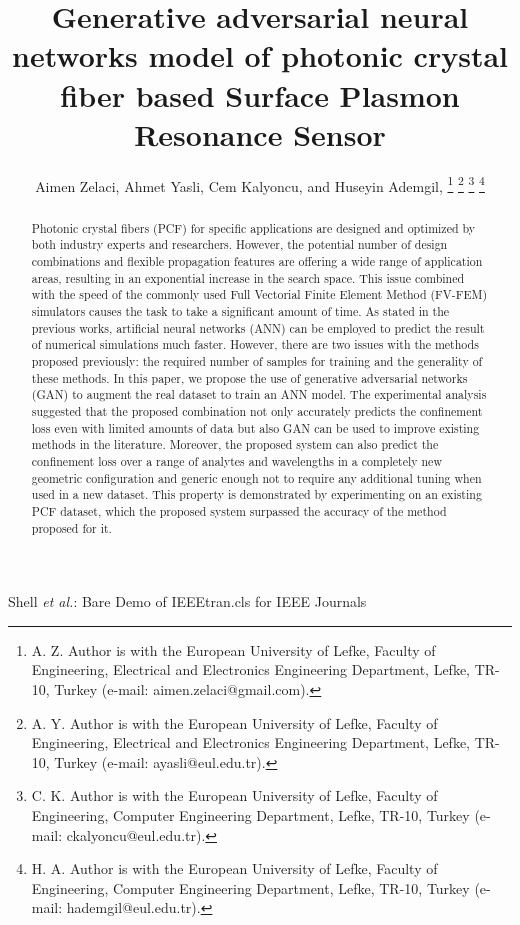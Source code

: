 \documentclass[journal]{IEEEtran}
\begin{document}
\title{Generative adversarial neural networks model of photonic crystal fiber based Surface Plasmon Resonance Sensor}
\author{
	Aimen Zelaci, Ahmet Yasli, Cem Kalyoncu, and Huseyin Ademgil, 
	\thanks{A. Z. Author is with 
		the European University of Lefke, Faculty of Engineering, Electrical and Electronics Engineering Department, Lefke, TR-10, Turkey (e-mail: aimen.zelaci@gmail.com).
	}
	\thanks{A. Y. Author is with 
		the European University of Lefke, Faculty of Engineering, Electrical and Electronics Engineering Department, Lefke, TR-10, Turkey (e-mail: ayasli@eul.edu.tr).
	}
	\thanks{C. K. Author is with 
		the European University of Lefke, Faculty of Engineering, Computer Engineering Department, Lefke, TR-10, Turkey (e-mail: ckalyoncu@eul.edu.tr).
	}
	\thanks{H. A. Author is with 
		the European University of Lefke, Faculty of Engineering, Computer Engineering Department, Lefke, TR-10, Turkey (e-mail: hademgil@eul.edu.tr).
	}
}



%
{Shell \MakeLowercase{\textit{et al.}}: Bare Demo of IEEEtran.cls for IEEE Journals}




\maketitle

\begin{abstract}
	Photonic crystal fibers (PCF) for specific applications are designed and optimized by both industry experts and researchers. However, the potential number of design combinations and flexible propagation features are offering a wide range of application areas, resulting in an exponential increase in the search space. This issue combined with the speed of the commonly used Full Vectorial Finite Element Method (FV-FEM) simulators causes the task to take a significant amount of time. As stated in the previous works, artificial neural networks (ANN) can be employed to predict the result of numerical simulations much faster. However, there are two issues with the methods proposed previously: the required number of samples for training and the generality of these methods. In this paper, we propose the use of generative adversarial networks (GAN) to augment the real dataset to train an ANN model. The experimental analysis suggested that the proposed combination not only accurately predicts the confinement loss even with limited amounts of data but also GAN can be used to improve existing methods in the literature. Moreover, the proposed system can also predict the confinement loss over a range of analytes and wavelengths in a completely new geometric configuration and generic enough not to require any additional tuning when used in a new dataset. This property is demonstrated by experimenting on an existing PCF dataset, which the proposed system surpassed the accuracy of the method proposed for it.
\end{abstract}
\end{document}
